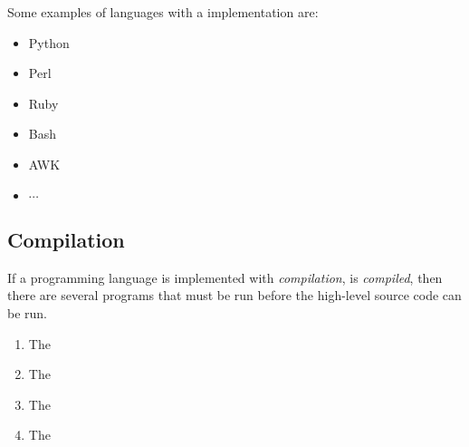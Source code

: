 Some examples of languages with a  implementation are:
\begin{itemize}[noitemsep]
\item Python
\item Perl
\item Ruby
\item Bash
\item AWK
\item $\cdots$
\end{itemize}

\subsection{Compilation}\label{subsec:Compilation}
\begin{definition}[Compilation]\label{def:Compilation}
  If a programming language is implemented with \emph{compilation}, is \emph{compiled}, then there are several programs that must be run before the high-level source code can be run.
  \begin{enumerate}[noitemsep]
  \item The 
  \item The 
  \item The 
  \item The 
  \end{enumerate}
\end{definition}

